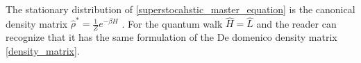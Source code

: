 The stationary distribution of \eqref{superstocahstic_master_equation} is the canonical density matrix $\hat\rho^* = \frac{1}{Z} e^{-\beta H}$ \cite{Shapira_Cohen}.
For the quantum walk $\hat H = \hat L$ and the reader can recognize that it has the same formulation of the De domenico density matrix \eqref{density_matrix}.

\begin{comment}
\begin{center}
    $\ast \; \ast \; \ast$
\end{center}

If i consider a network in contact with a thermal bath as a system composed by a particle that move around. The particle movements are regulated by the Adjacency matrix, but there is a small probability that the particle disappear from a node and teleport to a random one. Thus, the new control operator should be the sum of the laplacian and the matrix $\xi$ composed as
\begin{equation}
    H_{ij} =\left\{ \begin{aligned}
        L_{ij} - \varepsilon * L_{ii} \qquad &L_{ij} \neq 0\\
        \epsilon \qquad & L_{ij} = 0\\
    \end{aligned}\right. 
\end{equation}

\begin{center}
    $\ast \; \ast \; \ast$
\end{center}
We consider that the system is susceptible to some thermal fluctuation that modify the dynamics by a term $\xi(t)\hat L$, where $\xi(t)$ indicates a white noise with zero average and variance $\sigma^2 = T$. The temperature $T$ as non physical meaning beyond the quantification of the fluctuations.

We can consider also a thermal fluctuation in the Lindblad master equation \eqref{lindblad_master_eq} adding a new term. We obtain
\begin{equation}
    \frac{d}{dt}\left<\hat \rho\right> = -i\left[\hat L,\hat\rho\right] + a \hat\rho a^\dagger -\frac{1}{2} \left\{ \hat L, \hat\rho\right\} + T a^\dagger \hat\rho a  -\frac{T}{2} \left\{aa^\dagger, \hat\rho\right\}.
\end{equation}

As before, the dynamics conserves the trace of $\hat\rho$. 


\end{comment}
